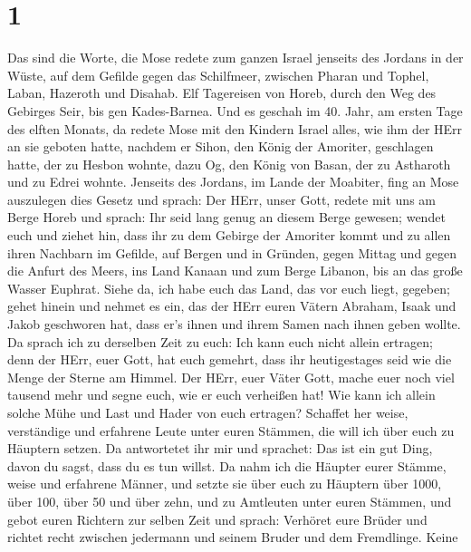 \hypertarget{section}{%
\section{1}\label{section}}

 Das sind die Worte, die Mose redete zum ganzen Israel
jenseits des Jordans in der Wüste, auf dem Gefilde gegen das Schilfmeer,
zwischen Pharan und Tophel, Laban, Hazeroth und Disahab. 
Elf Tagereisen von Horeb, durch den Weg des Gebirges Seir, bis gen
Kades-Barnea.  Und es geschah im 40. Jahr, am ersten Tage
des elften Monats, da redete Mose mit den Kindern Israel alles, wie ihm
der HErr an sie geboten hatte,  nachdem er Sihon, den König
der Amoriter, geschlagen hatte, der zu Hesbon wohnte, dazu Og, den König
von Basan, der zu Astharoth und zu Edrei wohnte.  Jenseits
des Jordans, im Lande der Moabiter, fing an Mose auszulegen dies Gesetz
und sprach:  Der HErr, unser Gott, redete mit uns am Berge
Horeb und sprach: Ihr seid lang genug an diesem Berge gewesen;
 wendet euch und ziehet hin, dass ihr zu dem Gebirge der
Amoriter kommt und zu allen ihren Nachbarn im Gefilde, auf Bergen und in
Gründen, gegen Mittag und gegen die Anfurt des Meers, ins Land Kanaan
und zum Berge Libanon, bis an das große Wasser Euphrat. 
Siehe da, ich habe euch das Land, das vor euch liegt, gegeben; gehet
hinein und nehmet es ein, das der HErr euren Vätern Abraham, Isaak und
Jakob geschworen hat, dass er's ihnen und ihrem Samen nach ihnen geben
wollte.  Da sprach ich zu derselben Zeit zu euch: Ich kann
euch nicht allein ertragen;  denn der HErr, euer Gott, hat
euch gemehrt, dass ihr heutigestages seid wie die Menge der Sterne am
Himmel.  Der HErr, euer Väter Gott, mache euer noch viel
tausend mehr und segne euch, wie er euch verheißen hat! 
Wie kann ich allein solche Mühe und Last und Hader von euch ertragen?
 Schaffet her weise, verständige und erfahrene Leute unter
euren Stämmen, die will ich über euch zu Häuptern setzen. 
Da antwortetet ihr mir und sprachet: Das ist ein gut Ding, davon du
sagst, dass du es tun willst.  Da nahm ich die Häupter
eurer Stämme, weise und erfahrene Männer, und setzte sie über euch zu
Häuptern über 1000, über 100, über 50 und über zehn, und zu Amtleuten
unter euren Stämmen,  und gebot euren Richtern zur selben
Zeit und sprach: Verhöret eure Brüder und richtet recht zwischen
jedermann und seinem Bruder und dem Fremdlinge.  Keine
